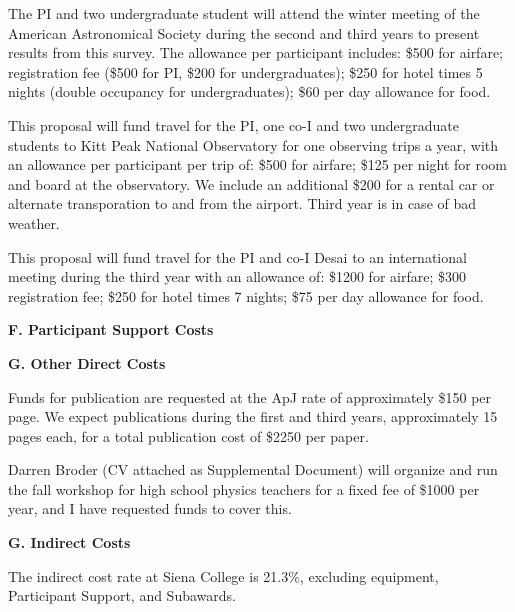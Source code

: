 \documentclass[preprint,11pt]{aastex}
\begin{document}
The PI and
two undergraduate student will attend 
the winter meeting of the American Astronomical
Society during the second and third years to present results from this survey.  
The allowance per participant 
includes: \$500 for airfare; registration fee (\$500 for PI, 
\$200 for undergraduates); \$250 for hotel times 5 nights
(double occupancy for undergraduates); \$60 per day allowance for food.  

This proposal will fund travel for the PI, one co-I and two undergraduate students 
to Kitt Peak National Observatory for one observing trips a year, with an allowance 
per participant per trip of: \$500 for airfare;
\$125 per night for room and board at the observatory.
We include an additional \$200 for a rental car or 
alternate transporation to and from the airport.
Third year is in case of bad weather.

This proposal will fund travel for the PI and co-I Desai to an international 
meeting during the third year with an allowance of:
\$1200 for airfare; \$300 registration fee; \$250 for hotel times 7 nights;
\$75 per day allowance for food.

\begin{center}
{\bf \large F. Participant Support Costs}
\end{center}

\begin{center}
{\bf \large G. Other Direct Costs}
\end{center}



Funds for publication are requested at the ApJ rate of approximately \$150 per page.
We expect publications during the first and third years, approximately 15 pages
each, for a total publication cost of \$2250 per paper.



Darren Broder (CV attached as Supplemental 
Document) will organize and run the fall workshop for high school physics teachers
for a fixed fee of \$1000 per year, and I have requested funds to cover
this.




\begin{center}
{\bf \large G. Indirect Costs}
\end{center}

The indirect cost rate at Siena College is 21.3\%, excluding
equipment, Participant Support, and Subawards.  
\end{document}
